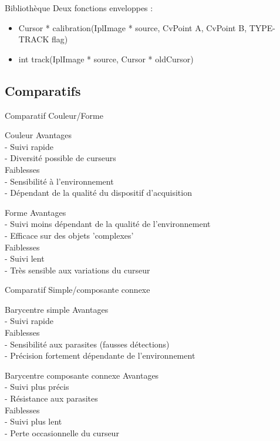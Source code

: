 \documentclass{beamer}
\begin{document}
		\begin{frame}{Bibliothèque}
		Deux fonctions enveloppes : \\
			\begin{itemize}
				\item{Cursor * calibration(IplImage * source, CvPoint A, CvPoint B, TYPE-TRACK flag)}
				\item{int track(IplImage * source, Cursor * oldCursor)}
			\end{itemize}		
		\end{frame}

		\subsection{Comparatifs}
		\begin{frame}{Comparatif Couleur/Forme}
		\pause
			\begin{block}{Couleur}
				Avantages \\
				- Suivi rapide \\
				- Diversité possible de curseurs \\
				Faiblesses \\
				- Sensibilité à l'environnement\\
				- Dépendant de la qualité du dispositif d'acquisition\\
			\end{block}
			\pause
			\begin{block}{Forme}
				Avantages \\
				- Suivi moins dépendant de la qualité de l'environnement \\
				- Efficace sur des objets 'complexes'\\
				Faiblesses \\
				- Suivi  lent \\
				- Très sensible aux variations du curseur\\
			\end{block}
		\end{frame}
		\begin{frame}{Comparatif Simple/composante connexe}
		\pause
			\begin{block}{Barycentre simple}
				Avantages \\
				- Suivi rapide \\
				Faiblesses \\
				- Sensibilité aux parasites (fausses détections)\\
				- Précision fortement dépendante de l'environnement\\
			\end{block}
			\pause
			\begin{block}{Barycentre composante connexe}
				Avantages \\
				- Suivi plus précis \\
				- Résistance aux parasites \\
				Faiblesses \\
				- Suivi plus lent \\
				- Perte occasionnelle du curseur
			\end{block}
		\end{frame}
\end{document}
